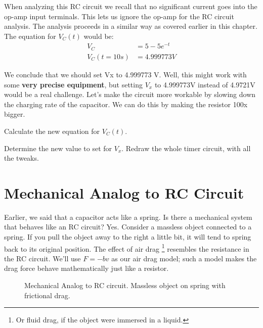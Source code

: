 When analyzing this RC circuit we recall that no significant current goes into the op-amp input terminals. This lets us ignore the op-amp for the RC circuit analysis. The analysis proceeds in a similar way as covered earlier in this chapter. The equation for $V_C(t)$ would be:\\

\begin{align*}
V_C &= 5 - 5e^{-t}\\
V_C(t=10s)&=4.999773 V
\end{align*}

We conclude that we should set Vx to 4.999773 V. Well, this might work with some \textbf{very precise equipment}, but setting $V_x$ to 4.999773V instead of 4.9721V would be a real challenge. Let's make the circuit more workable by slowing down the charging rate of the capacitor. We can do this by making the resistor 100x bigger.

\begin{clevel}
Calculate the new equation for $V_C(t)$.
\end{clevel}

\begin{clevel}
Determine the new value to set for $V_x$. Redraw the whole timer circuit, with all the tweaks.
\end{clevel}
\section{Mechanical Analog to RC Circuit}
Earlier, we said that a capacitor acts like a spring. Is there a mechanical system that behaves like an RC circuit? Yes. Consider a massless object connected to a spring. If you pull the object away to the right a little bit, it will tend to spring back to its original position. The effect of air drag \footnote{Or fluid drag, if the object were immersed in a liquid.} resembles the resistance in the RC circuit. We'll use $F=-bv$ as our air drag model; such a model makes the drag force behave mathematically just like a resistor.\par

\begin{figure}[H]
\begin{center}
\caption{Mechanical Analog to RC circuit. Massless object on spring with frictional drag.}
\label{F:6RCM}
\end{center}
\end{figure}

